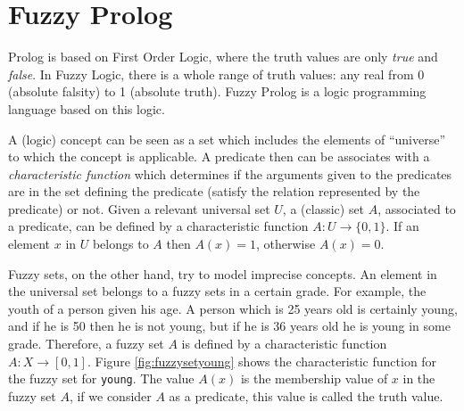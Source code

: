 
\section{Fuzzy Prolog}

Prolog is based on First Order Logic, where the truth values are only
{\em true} and {\em false}. In Fuzzy Logic, there is a whole range of
truth values: any real from 0 (absolute falsity) to 1 (absolute
truth). Fuzzy Prolog is a logic programming language based on
this logic.

A (logic) concept can be seen as a set which includes the elements of 
``universe'' to which the concept is applicable. A predicate then can
be associates with a {\em characteristic function} which determines if
the arguments given to the predicates are in the set defining the
predicate (satisfy the relation represented by the predicate) or not.
%
Given a relevant universal set $U$, a (classic) set $A$, associated to
a predicate, can be defined by a characteristic function 
$A : U\rightarrow \{0,1\}$. If an element $x$ in $U$ belongs to $A$
then $A(x) = 1$, otherwise $A(x) = 0$.

Fuzzy sets, on the other hand, try to model imprecise concepts. An
element in the universal set belongs to a fuzzy sets in a certain
grade. For example, the youth of a person given his age. A person
which is 25 years old is certainly young, and if he is 50 then he is
not young, but if he is 36 years old he is young in some
grade. Therefore, a fuzzy set $A$ is defined by a characteristic
function $A : X \rightarrow [0,1]$. Figure \ref{fig:fuzzysetyoung}
shows the characteristic function for the fuzzy set for \texttt{young}.
The value $A(x)$ is the membership value of $x$ in the fuzzy set $A$,
if we consider $A$ as a predicate, this value is called the truth value.


